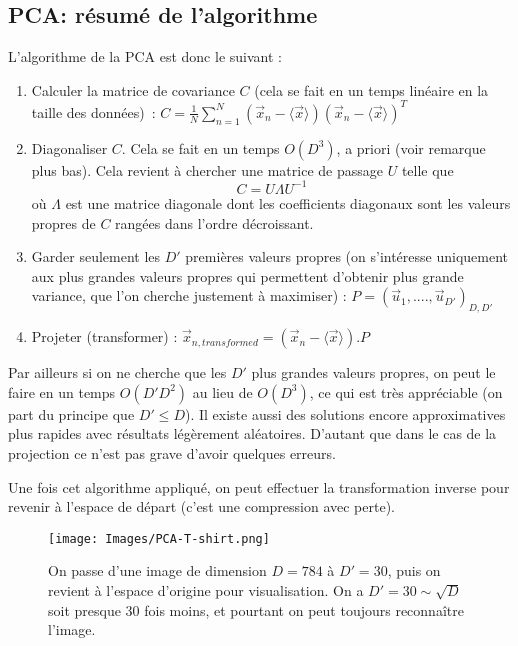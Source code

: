\documentclass[french,twoside]{article}
\begin{document}
\subsection{PCA: résumé de l'algorithme}

L'algorithme de la PCA est donc le suivant : 

\begin{enumerate}
\item Calculer la matrice de covariance $C$ (cela se fait en un temps linéaire en la taille des données)~: $C = \frac{1}{N}\sum_{n=1}^{N}(\vec{x}_n-\langle\vec{x}\rangle)(\vec{x}_n-\langle\vec{x}\rangle)^T$
\item Diagonaliser $C$. Cela se fait en un temps $O(D^3)$, a priori (voir remarque plus bas). Cela revient à chercher une matrice de passage $U$ telle que $$ C = U\Lambda U^{-1}$$ où $\Lambda$ est une matrice diagonale dont les coefficients diagonaux sont les valeurs propres de $C$ rangées dans l'ordre décroissant.
\item Garder seulement les $D'$ premières valeurs propres (on s'intéresse uniquement aux plus grandes valeurs propres qui permettent d'obtenir plus grande variance, que l'on cherche justement à maximiser) : $P = (\vec{u}_1, ...., \vec{u}_{D'})_{D, D'}$
\item Projeter (transformer) : $\vec{x}_{n, transformed} = (\vec{x}_n-\langle\vec{x}\rangle). P$
\end{enumerate}

Par ailleurs si on ne cherche que les $D'$ plus grandes valeurs propres, on peut le faire en un temps $O(D'D^2)$ au lieu de $O(D^3)$, ce qui est très appréciable 
(on part du principe que $D'\leq D$).
Il existe aussi des solutions encore approximatives plus rapides avec résultats légèrement aléatoires. D'autant que dans le cas de la projection ce n'est pas grave d'avoir quelques erreurs.

Une fois cet algorithme appliqué, on peut effectuer la transformation inverse pour revenir à l'espace de départ (c'est une compression avec perte).

\begin{figure}
    \centering
    \texttt{[image: Images/PCA-T-shirt.png]}
    \caption{
    \label{fig:PCAdecompress}
    On passe d'une image de dimension $D = 784$ à $D' = 30$, puis on revient à l'espace d'origine pour visualisation. On a $D' = 30 \sim \sqrt{D}$ soit presque 30 fois moins, et pourtant on peut toujours reconnaître l'image.
    }
\end{figure}
\end{document}
